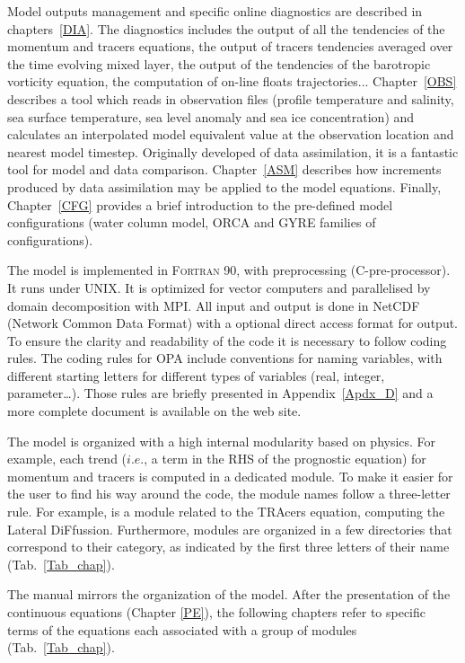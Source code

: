 Model outputs management and specific online diagnostics are described in chapters~\ref{DIA}.
The diagnostics includes the output of all the tendencies of the momentum and tracers equations, 
the output of tracers tendencies averaged over the time evolving mixed layer, the output of 
the tendencies of the barotropic vorticity equation, the computation of on-line floats trajectories... 
Chapter~\ref{OBS} describes a tool which reads in observation files (profile temperature 
and salinity, sea surface temperature, sea level anomaly and sea ice concentration) 
and calculates an interpolated model equivalent value at the observation location 
and nearest model timestep. Originally developed of data assimilation, it is a fantastic 
tool for model and data comparison. Chapter~\ref{ASM} describes how increments 
produced by data assimilation may be applied to the model equations.
Finally, Chapter~\ref{CFG} provides a brief introduction to the pre-defined model 
configurations (water column model, ORCA and GYRE families of configurations).

The model is implemented in \textsc{Fortran 90}, with preprocessing (C-pre-processor). 
It runs under UNIX. It is optimized for vector computers and parallelised by domain  
decomposition with MPI. All input and output is done in NetCDF (Network Common Data 
Format) with a optional direct access format for output. To ensure the clarity and 
readability of the code it is necessary to follow coding rules. The coding rules for OPA 
include conventions for naming variables, with different starting letters for different types 
of variables (real, integer, parameter\ldots). Those rules are briefly presented in 
Appendix~\ref{Apdx_D} and a more complete document is available on the \NEMO web site.

The model is organized with a high internal modularity based on physics. For example, 
each trend ($i.e.$, a term in the RHS of the prognostic equation) for momentum and 
tracers is computed in a dedicated module.  To make it easier for the user to find his way 
around the code, the module names follow a three-letter rule. For example,  
is a module related to the TRAcers equation, computing the Lateral DiFfussion. 
Furthermore, modules are organized in a few directories that correspond to their category, 
as indicated by the first three letters of their name (Tab.~\ref{Tab_chap}). 

The manual mirrors the organization of the model. 
After the presentation of the continuous equations (Chapter \ref{PE}), the following chapters 
refer to specific terms of the equations each associated with a group of modules (Tab.~\ref{Tab_chap}).


